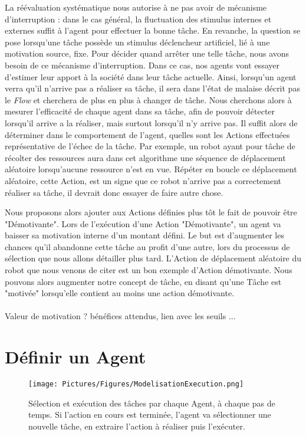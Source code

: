			La réévaluation systématique nous autorise à ne pas avoir de mécanisme d'interruption : dans le cas général, la fluctuation des stimulus internes et externes suffit à l'agent pour effectuer la bonne tâche. En revanche, la question se pose lorsqu'une tâche possède un stimulus déclencheur artificiel, lié à une motivation source, fixe. Pour décider quand arrêter une telle tâche, nous avons besoin de ce mécanisme d'interruption. Dans ce cas, nos agents vont essayer d'estimer leur apport à la société dans leur tâche actuelle. Ainsi, lorsqu'un agent verra qu'il n'arrive pas a réaliser sa tâche, il sera dans l'état de malaise décrit pas le \textit{Flow} et cherchera de plus en plus à changer de tâche. Nous cherchons alors à mesurer l'efficacité de chaque agent dans sa tâche, afin de pouvoir détecter lorsqu'il arrive a la réaliser, mais surtout lorsqu'il n'y arrive pas. Il suffit alors de déterminer dans le comportement de l'agent, quelles sont les Actions effectuées représentative de l'échec de la tâche. Par exemple, un robot ayant pour tâche de récolter des ressources aura dans cet algorithme une séquence de déplacement aléatoire lorsqu'aucune ressource n'est en vue. Répéter en boucle ce déplacement aléatoire, cette Action, est un signe que ce robot n'arrive pas a correctement réaliser sa tâche, il devrait donc essayer de faire autre chose.
			
			Nous proposons alors ajouter aux Actions définies plus tôt le fait de pouvoir être "Démotivante". Lors de l'exécution d'une Action "Démotivante", un agent va baisser sa motivation interne d'un montant défini. Le but est d'augmenter les chances qu'il abandonne cette tâche au profit d'une autre, lors du processus de sélection que nous allons détailler plus tard. L'Action de déplacement aléatoire du robot que nous venons de citer est un bon exemple d'Action démotivante. Nous pouvons alors augmenter notre concept de tâche, en disant qu'une Tâche est "motivée" lorsqu'elle contient au moins une action démotivante.
			
			\paragraph{}
			Valeur de motivation ? bénéfices attendus, lien avec les seuils ...
	
	\section{Définir un Agent}
	
	\begin{figure}
	\centering
	\texttt{[image: Pictures/Figures/ModelisationExecution.png]}
	\caption[Sélection et exécution des tâches par chaque Agent, à chaque pas de temps.]{Sélection et exécution des tâches par chaque Agent, à chaque pas de temps. Si l'action en cours est terminée, l'agent va sélectionner une nouvelle tâche, en extraire l'action à réaliser puis l'exécuter.}
	\label{agentExec}
	\end{figure}		
	
